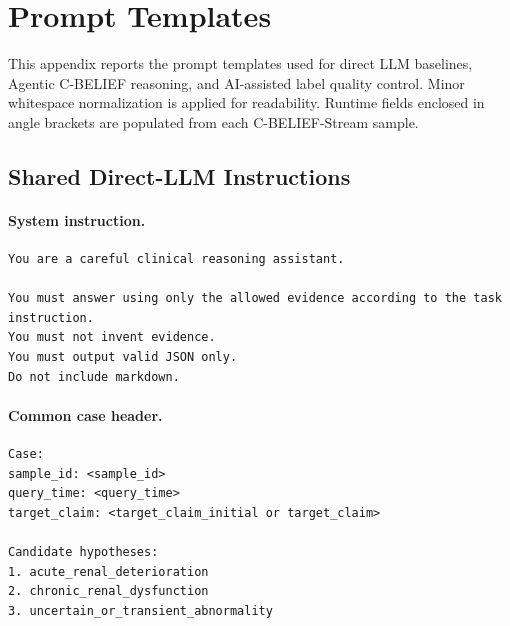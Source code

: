 \appendix
\section{Prompt Templates}
\label{app:prompt_templates}

This appendix reports the prompt templates used for direct LLM baselines,
Agentic C-BELIEF reasoning, and AI-assisted label quality control. Minor
whitespace normalization is applied for readability. Runtime fields enclosed
in angle brackets are populated from each C-BELIEF-Stream sample.

\subsection{Shared Direct-LLM Instructions}
\label{app:shared_direct_llm}

\paragraph{System instruction.}
\begin{verbatim}
You are a careful clinical reasoning assistant.

You must answer using only the allowed evidence according to the task instruction.
You must not invent evidence.
You must output valid JSON only.
Do not include markdown.
\end{verbatim}

\paragraph{Common case header.}
\begin{verbatim}
Case:
sample_id: <sample_id>
query_time: <query_time>
target_claim: <target_claim_initial or target_claim>

Candidate hypotheses:
1. acute_renal_deterioration
2. chronic_renal_dysfunction
3. uncertain_or_transient_abnormality
\end{verbatim}


